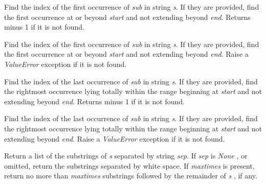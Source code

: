 Find the index of the first
occurrence of \emph{sub} in string \emph{s}. If they are provided, find
the first occurrence at or beyond \emph{start} and not extending beyond
\emph{end}. Returns minus 1 if it is not found.













Find the index of the first
occurrence of \emph{sub} in string \emph{s}. If they are provided, find
the first occurrence at or beyond \emph{start} and not extending beyond
\emph{end}. Raise a \emph{ValueError} exception if it is not found.













Find the index of the last
occurrence of \emph{sub} in string \emph{s}. If they are provided, find
the rightmost occurrence lying totally within the range beginning at
\emph{start} and not extending beyond \emph{end}. Returns minus 1 if it
is not found.













Find the index of the last
occurrence of \emph{sub} in string \emph{s}. If they are provided, find
the rightmost occurrence lying totally within the range beginning at
\emph{start} and not extending beyond \emph{end}. Raise a
\emph{ValueError} exception if it is not found.













Return a list of the substrings of
\emph{s} separated by string \emph{sep}. If \emph{sep} is \emph{None} ,
or omitted, return the substrings separated by white space. If
\emph{maxtimes} is present, return no more than \emph{maxtimes}
substrings followed by the remainder of \emph{s} , if any.







